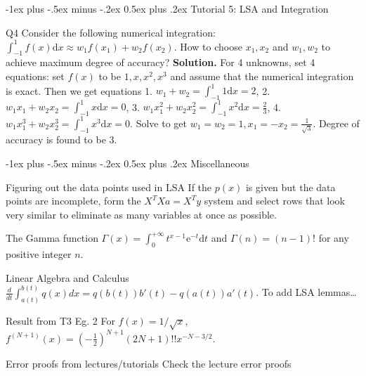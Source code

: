\documentclass[10pt,landscape]{article}
\makeatletter
\renewcommand{\section}{\@startsection{section}{1}{0mm}%
                                {-1ex plus -.5ex minus -.2ex}%
                                {0.5ex plus .2ex}%
                                {\normalfont\large\bfseries}}
\theoremstyle{definition}
\newcommand{\thistheoremname}{}
\newtheorem*{genericthm*}{\thistheoremname}
\newenvironment{namedthm*}[1]
{\renewcommand{\thistheoremname}{#1}\begin{genericthm*}}
{\end{genericthm*}}
\makeatother
\begin{document}
\begin{multicols}{3}
	\section{Tutorial 5: LSA and Integration}
	\begin{namedthm*}{Q4}
		Consider the following numerical integration: \(\int_{-1}^{1} f(x) \mathrm{d} x \approx w_{1} f\left(x_{1}\right)+w_{2} f\left(x_{2}\right)\).
		How to choose \(x_{1}, x_{2}\) and \(w_{1}, w_{2}\) to achieve maximum degree of accuracy? \textbf{Solution.} For 4 unknowns, set 4 equations: set \(f(x)\) to be \(1, x, x^{2}, x^{3}\) and assume that the numerical integration is exact. Then we get
		equations 1.
		\(
		w_{1}+w_{2}=\int_{-1}^{1} 1 \mathrm{d} x=2
		\), 2.
		\(w_{1} x_{1}+w_{2} x_{2}=\int_{-1}^{1} x \mathrm{d} x=0\), 3.
		\(w_{1} x_{1}^{2}+w_{2} x_{2}^{2}=\int_{-1}^{1} x^{2} \mathrm{d} x=\frac{2}{3}\), 4.
		\(w_{1} x_{1}^{3}+w_{2} x_{2}^{3}=\int_{-1}^{1} x^{3} \mathrm{d} x=0\). Solve to get \(w_1 = w_2 = 1, x_1 = -x_2 = \frac{1}{\sqrt{3}}\). Degree of accuracy is found to be 3.

	\end{namedthm*}

	\section{Miscellaneous}
	\begin{namedthm*}{Figuring out the data points used in LSA} If the \(p(x)\) is given but the data points are incomplete, form the \(X^TXa=X^Ty\) system and select rows that look very similar to eliminate as many variables at once as possible.
	\end{namedthm*}
	\begin{namedthm*}{The Gamma function} \(\Gamma(x)=\int_{0}^{+\infty} t^{x-1} \mathrm{e}^{-t} \mathrm{d} t\) and \(\Gamma(n)=(n-1) !\) for any positive integer \(n\).
	\end{namedthm*}
	\begin{namedthm*}{Linear Algebra and Calculus}
		\(\frac{d}{dt}\int_{a(t)}^{b(t)}q(x)dx= q(b(t))b'(t)-q(a(t))a'(t)\).
		\color{red}
		To add LSA lemmas\dots
		\color{black}
	\end{namedthm*}
	\begin{namedthm*}{Result from T3 Eg. 2}
		For \(f(x)=1 / \sqrt{x}\),
		\(
		f^{(N+1)}(x)=\left(-\frac{1}{2}\right)^{N+1}(2 N+1) !! x^{-N-3 / 2}
		\).
	\end{namedthm*}
	\begin{namedthm*}{Error proofs from lectures/tutorials}
		\color{red} Check the lecture error proofs
		\color{black}


\end{namedthm*}
\end{multicols}
\end{document}
